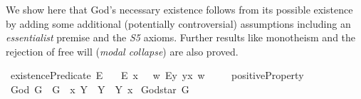 %
\begin{isabellebody}%
%
%
\isadelimtheory
%
\endisadelimtheory
%
\isatagtheory
%
\endisatagtheory
{\isafoldtheory}%
%
\isadelimtheory
%
\endisadelimtheory
%
\isamarkuptrue%
%
\begin{isamarkuptext}%
We show here that God's necessary existence follows from its possible existence by adding some
 additional (potentially controversial) assumptions including an \emph{essentialist} premise 
 and the \emph{S5} axioms.
 Further results like monotheism and the rejection of free will (\emph{modal collapse}) are also proved.%
\end{isamarkuptext}\isamarkuptrue%
%
\isamarkuptrue%
\isamarkupfalse%
\ existencePredicate{\isacharcolon}{\isacharcolon}{\isachardoublequoteopen}{\isasymup}{\isasymlangle}{\isasymzero}{\isasymrangle}{\isachardoublequoteclose}\ {\isacharparenleft}{\isachardoublequoteopen}E{\isacharbang}{\isachardoublequoteclose}{\isacharparenright}\ \isanewline
\ \ {\isachardoublequoteopen}E{\isacharbang}\ x\ \ {\isasymequiv}\ {\isacharparenleft}{\isasymlambda}w{\isachardot}\ {\isacharparenleft}\isactrlbold {\isasymexists}\isactrlsup Ey{\isachardot}\ y\isactrlbold {\isasymapprox}x{\isacharparenright}\ w{\isacharparenright}{\isachardoublequoteclose}\ \isanewline
\ \ \isanewline
{}\isamarkupfalse%
\ positiveProperty{\isacharcolon}{\isacharcolon}{\isachardoublequoteopen}{\isasymup}{\isasymlangle}{\isasymup}{\isasymlangle}{\isasymzero}{\isasymrangle}{\isasymrangle}{\isachardoublequoteclose}\ {\isacharparenleft}{\isachardoublequoteopen}{\isasymP}{\isachardoublequoteclose}{\isacharparenright}\isanewline
\ \ \isanewline
{}\isamarkupfalse%
\ God{\isacharcolon}{\isacharcolon}{\isachardoublequoteopen}{\isasymup}{\isasymlangle}{\isasymzero}{\isasymrangle}{\isachardoublequoteclose}\ {\isacharparenleft}{\isachardoublequoteopen}G{\isachardoublequoteclose}{\isacharparenright}\ \ {\isachardoublequoteopen}G\ {\isasymequiv}\ {\isacharparenleft}{\isasymlambda}x{\isachardot}\ \isactrlbold {\isasymforall}Y{\isachardot}\ {\isasymP}\ Y\ \isactrlbold {\isasymrightarrow}\ Y\ x{\isacharparenright}{\isachardoublequoteclose}\isanewline
{}\isamarkupfalse%
\ God{\isacharunderscore}star{\isacharcolon}{\isacharcolon}{\isachardoublequoteopen}{\isasymup}{\isasymlangle}{\isasymzero}{\isasymrangle}{\isachardoublequoteclose}\ {\isacharparenleft}{\isachardoublequoteopen}G{\isacharasterisk}{\isachardoublequoteclose}{\isacharparenright}\ \isanewline

\end{isabellebody}
